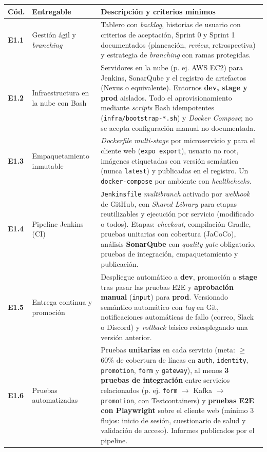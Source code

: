 \documentclass[10pt,letterpaper]{article}
\begin{document}
\begin{tabularx}{\textwidth}{|L{1.0cm}|L{3.3cm}|X|}
\hline
{}
\textbf{Cód.} & \textbf{Entregable} & \textbf{Descripción y criterios mínimos} \\ \hline
\textbf{E1.1} & Gestión ágil y \textit{branching} & Tablero con \textit{backlog}, historias de usuario con criterios de aceptación, Sprint 0 y Sprint 1 documentados (planeación, \textit{review}, retrospectiva) y estrategia de \textit{branching} con ramas protegidas. \\ \hline
\textbf{E1.2} & Infraestructura en la nube con Bash & Servidores en la nube (p. ej. AWS EC2) para Jenkins, SonarQube y el registro de artefactos (Nexus o equivalente). Entornos \textbf{dev, stage y prod} aislados. Todo el aprovisionamiento mediante \textit{scripts} Bash idempotentes (\texttt{infra/bootstrap-*.sh}) y \textit{Docker Compose}; no se acepta configuración manual no documentada. \\ \hline
\textbf{E1.3} & Empaquetamiento inmutable & \textit{Dockerfile} \textit{multi-stage} por microservicio y para el cliente web (\texttt{expo export}), usuario no root, imágenes etiquetadas con versión semántica (nunca \texttt{latest}) y publicadas en el registro. Un \texttt{docker-compose} por ambiente con \textit{healthchecks}. \\ \hline
\textbf{E1.4} & Pipeline Jenkins (CI) & \texttt{Jenkinsfile} \textit{multibranch} activado por \textit{webhook} de GitHub, con \textit{Shared Library} para etapas reutilizables y ejecución por servicio (modificado o todos). Etapas: \textit{checkout}, compilación Gradle, pruebas unitarias con cobertura (JaCoCo), análisis \textbf{SonarQube} con \textit{quality gate} obligatorio, pruebas de integración, empaquetamiento y publicación. \\ \hline
\textbf{E1.5} & Entrega continua y promoción & Despliegue automático a \textbf{dev}, promoción a \textbf{stage} tras pasar las pruebas E2E y \textbf{aprobación manual} (\texttt{input}) para \textbf{prod}. Versionado semántico automático con \textit{tag} en Git, notificaciones automáticas de fallo (correo, Slack o Discord) y \textit{rollback} básico redesplegando una versión anterior. \\ \hline
\textbf{E1.6} & Pruebas automatizadas & Pruebas \textbf{unitarias} en cada servicio (meta: $\geq$ 60\% de cobertura de líneas en \texttt{auth}, \texttt{identity}, \texttt{promotion}, \texttt{form} y \texttt{gateway}), al menos \textbf{3 pruebas de integración} entre servicios relacionados (p. ej. \texttt{form} $\rightarrow$ Kafka $\rightarrow$ \texttt{promotion}, con Testcontainers) y \textbf{pruebas E2E con Playwright} sobre el cliente web (mínimo 3 flujos: inicio de sesión, cuestionario de salud y validación de acceso). Informes publicados por el pipeline. \\ \hline

\end{tabularx}
\end{document}
